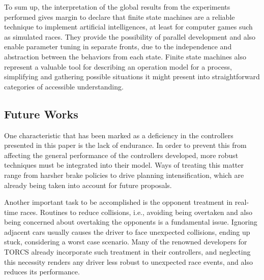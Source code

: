 	To sum up, the interpretation of the global results from the experiments performed gives margin to declare that finite state machines are a reliable technique to implement artificial intelligences, at least for computer games such as simulated races. They provide the possibility of parallel development and also enable parameter tuning in separate fronts, due to the independence and abstraction between the behaviors from each state. Finite state machines also represent a valuable tool for describing an operation model for a process, simplifying and gathering possible situations it might present into straightforward categories of accessible understanding.

\subsection{Future Works} \label{subsec:Future}
	
	One characteristic that has been marked as a deficiency in the controllers presented in this paper is the lack of endurance. In order to prevent this from affecting the general performance of the controllers developed, more robust techniques must be integrated into their model. Ways of treating this matter range from harsher brake policies to drive planning intensification, which are already being taken into account for future proposals.
		
	Another important task to be accomplished is the opponent treatment in real-time races. Routines to reduce collisions, i.e., avoiding being overtaken and also being concerned about overtaking the opponents is a fundamental issue. Ignoring adjacent cars usually causes the driver to face unexpected collisions, ending up stuck, considering a worst case scenario. Many of the renowned developers for TORCS already incorporate such treatment in their controllers, and neglecting this necessity renders any driver less robust to unexpected race events, and also reduces its performance.
	
	